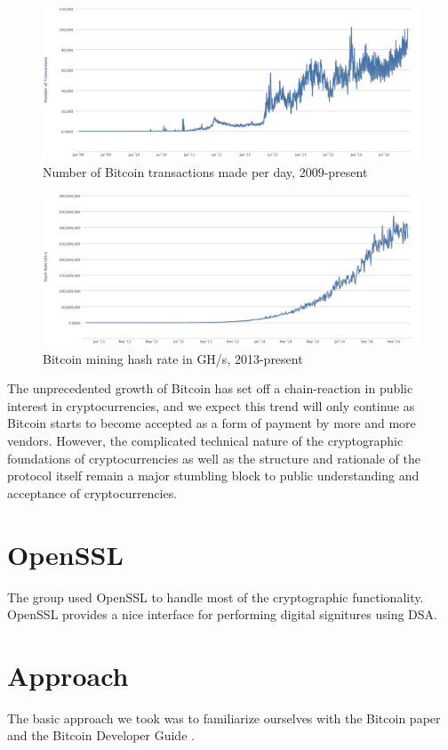 \documentclass[12pt]{article}
\begin{document}
\begin{figure}[h!]
  \centering
  \includegraphics[width=\textwidth]{chart-transactions.png}
  \caption{Number of Bitcoin transactions made per day, 2009-present\cite{blockchain:transactions}}
\end{figure}
\begin{figure}[h!]
  \centering
  \includegraphics[width=\textwidth]{chart-hashrate.png}
  \caption{Bitcoin mining hash rate in GH/s, 2013-present\cite{blockchain:hashrate}}
\end{figure}

The unprecedented growth of Bitcoin has set off a chain-reaction in public interest in cryptocurrencies, and we expect this trend will only continue as Bitcoin starts to become accepted as a form of payment by more and more vendors\cite{chokun:vendors}. However, the complicated technical nature of the cryptographic foundations of cryptocurrencies as well as the structure and rationale of the protocol itself remain a major stumbling block to public understanding and acceptance of cryptocurrencies. 

\section{OpenSSL}
The group used OpenSSL to handle most of the cryptographic functionality. OpenSSL provides a nice interface for performing digital signitures using DSA.

\section{Approach}
The basic approach we took was to familiarize ourselves with the Bitcoin paper\cite{nakamoto:bitcoin} and the Bitcoin Developer Guide \cite{dev:guide}. 
\end{document}
